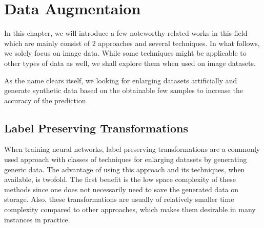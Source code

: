 

\chapter{Data Augmentaion}
\label{tit:data-augmentation}
In this chapter, we will introduce a few noteworthy related works in this field which are mainly consist of $2$ approaches and several techniques.
In what follows, we solely focus on image data.  While some techniques might be applicable to other
types of data as well, we shall explore them when used on image datasets.

As the name clears itself, we looking for enlarging datasets artificially and generate synthetic
data based on the obtainable few samples to increase the accuracy of the prediction.

\section{Label Preserving Transformations}
\label{tit:label-preserving}
When training neural networks, label preserving transformations are a commonly used approach with classes of
techniques for enlarging datasets by generating generic data. The advantage of using this approach
and its techniques, when available, is twofold. The first benefit is the low space complexity of these
methods since one does not necessarily need to save the generated data on storage. Also, these
transformations are usually of relatively smaller time complexity compared to other approaches,
which makes them desirable in many instances in practice.

